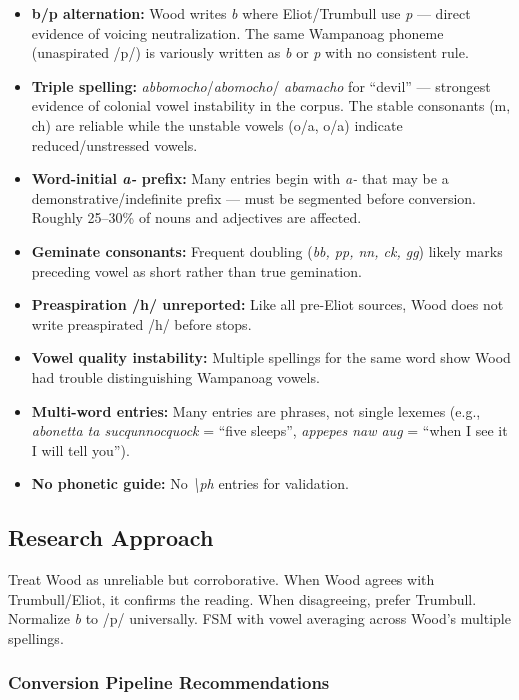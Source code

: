 \begin{itemize}
  \item \textbf{b/p alternation:} Wood writes \emph{b} where Eliot/Trumbull use
    \emph{p} --- direct evidence of voicing neutralization. The same Wampanoag
    phoneme (unaspirated /p/) is variously written as \emph{b} or \emph{p}
    with no consistent rule.
  \item \textbf{Triple spelling:} \emph{abbomocho}/\emph{abomocho}/
    \emph{abamacho} for ``devil'' --- strongest evidence of colonial vowel
    instability in the corpus. The stable consonants (m, ch) are reliable while
    the unstable vowels (o/a, o/a) indicate reduced/unstressed vowels.
  \item \textbf{Word-initial \emph{a-} prefix:} Many entries begin with
    \emph{a-} that may be a demonstrative/indefinite prefix --- must be
    segmented before conversion. Roughly 25--30\% of nouns and adjectives are
    affected.
  \item \textbf{Geminate consonants:} Frequent doubling (\emph{bb, pp, nn, ck,
    gg}) likely marks preceding vowel as short rather than true gemination.
  \item \textbf{Preaspiration /h/ unreported:} Like all pre-Eliot sources, Wood
    does not write preaspirated /h/ before stops.
  \item \textbf{Vowel quality instability:} Multiple spellings for the same word
    show Wood had trouble distinguishing Wampanoag vowels.
  \item \textbf{Multi-word entries:} Many entries are phrases, not single
    lexemes (e.g., \emph{abonetta ta sucqunnocquock} = ``five sleeps'',
    \emph{appepes naw aug} = ``when I see it I will tell you'').
  \item \textbf{No phonetic guide:} No \emph{\textbackslash ph} entries for
    validation.
\end{itemize}

\subsection{Research Approach}

Treat Wood as unreliable but corroborative. When Wood agrees with
Trumbull/Eliot, it confirms the reading. When disagreeing, prefer Trumbull.
Normalize \emph{b} to /p/ universally. FSM with vowel averaging across Wood's
multiple spellings.

\subsubsection{Conversion Pipeline Recommendations}

